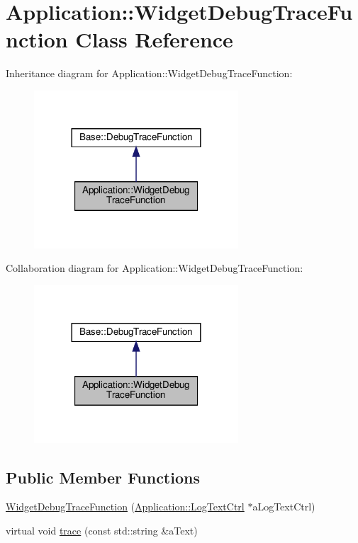 \hypertarget{class_application_1_1_widget_debug_trace_function}{}\section{Application\+:\+:Widget\+Debug\+Trace\+Function Class Reference}
\label{class_application_1_1_widget_debug_trace_function}


Inheritance diagram for Application\+:\+:Widget\+Debug\+Trace\+Function\+:
\nopagebreak
\begin{figure}[H]
\begin{center}
\leavevmode
\includegraphics[width=216pt]{class_application_1_1_widget_debug_trace_function__inherit__graph}
\end{center}
\end{figure}


Collaboration diagram for Application\+:\+:Widget\+Debug\+Trace\+Function\+:
\nopagebreak
\begin{figure}[H]
\begin{center}
\leavevmode
\includegraphics[width=216pt]{class_application_1_1_widget_debug_trace_function__coll__graph}
\end{center}
\end{figure}
\subsection*{Public Member Functions}
\begin{DoxyCompactItemize}
\item 
\hyperlink{class_application_1_1_widget_debug_trace_function_afcc3b377364d45d52dd5f3a580e919ff}{Widget\+Debug\+Trace\+Function} (\hyperlink{class_application_1_1_log_text_ctrl}{Application\+::\+Log\+Text\+Ctrl} $\ast$a\+Log\+Text\+Ctrl)
\item 
virtual void \hyperlink{class_application_1_1_widget_debug_trace_function_ad4bf02cb1270957ff75fd07fe6b7f678}{trace} (const std\+::string \&a\+Text)
\end{DoxyCompactItemize}


